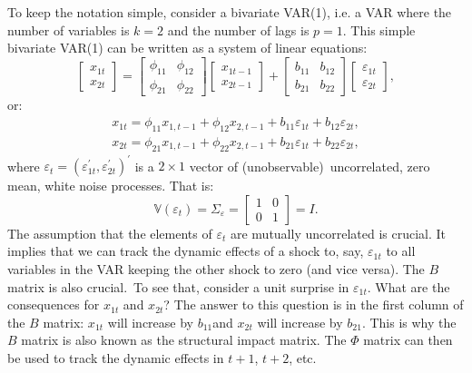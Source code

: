 \documentclass[10pt]{article}
\begin{document}
To keep the notation simple, consider a bivariate VAR(1), i.e. a VAR where
the number of variables is $k=2$ and the number of lags is $p=1$. This
simple bivariate VAR(1) can be written as a system of linear equations:%
\begin{equation}
\begin{bmatrix}
x_{1t} \\ 
x_{2t}%
\end{bmatrix}%
=%
\begin{bmatrix}
\phi _{11} & \phi _{12} \\ 
\phi _{21} & \phi _{22}%
\end{bmatrix}%
\begin{bmatrix}
x_{1t-1} \\ 
x_{2t-1}%
\end{bmatrix}%
+%
\begin{bmatrix}
b_{11} & b_{12} \\ 
b_{21} & b_{22}%
\end{bmatrix}%
\begin{bmatrix}
\varepsilon _{1t} \\ 
\varepsilon _{2t}%
\end{bmatrix}%
,  \label{eq:struct_var_1}
\end{equation}%
or:%
\begin{equation}
\begin{array}{c}
x_{1t}=\phi _{11}x_{1,t-1}+\phi _{12}x_{2,t-1}+b_{11}\varepsilon
_{1t}+b_{12}\varepsilon _{2t}, \\ 
x_{2t}=\phi _{21}x_{1,t-1}+\phi _{22}x_{2,t-1}+b_{21}\varepsilon
_{1t}+b_{22}\varepsilon _{2t},%
\end{array}
\label{eq:struct_var_2}
\end{equation}%
where $\varepsilon _{t}=(\varepsilon _{1t}^{\prime },\varepsilon
_{2t}^{\prime })^{\prime }$ is a $2\times 1$ vector of (unobservable)\
uncorrelated, zero mean, white noise processes. That is:%
\begin{equation}
\mathbb{V}(\varepsilon _{t})=\Sigma _{\varepsilon }=\left[ 
\begin{array}{cc}
1 & 0 \\ 
0 & 1%
\end{array}%
\right] =I.  \label{eq:struct_cov_1}
\end{equation}%
The assumption that the elements of $\varepsilon _{t}$ are mutually
uncorrelated is crucial. It implies that we can track the dynamic effects of
a shock to, say, $\varepsilon _{1t}$ to all variables in the VAR keeping the
other shock to zero (and vice versa). The $B$ matrix is also crucial.\ To
see that, consider a unit surprise in $\varepsilon _{1t}$. What are the
consequences for $x_{1t}$ and $x_{2t}$? The answer to this question is in
the first column of the $B$ matrix: $x_{1t}$ will increase by $b_{11}$and $%
x_{2t}$ will increase by $b_{21}$. This is why the $B$ matrix is also known
as the structural impact matrix. The $\Phi $ matrix can then be used to
track the dynamic effects in $t+1$, $t+2$, etc.
\end{document}

